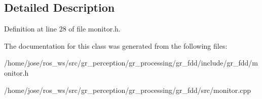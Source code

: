 \subsection{Detailed Description}


Definition at line 28 of file monitor.\+h.



The documentation for this class was generated from the following files\+:\begin{DoxyCompactItemize}
\item 
/home/jose/ros\+\_\+ws/src/gr\+\_\+perception/gr\+\_\+processing/gr\+\_\+fdd/include/gr\+\_\+fdd/monitor.\+h\item 
/home/jose/ros\+\_\+ws/src/gr\+\_\+perception/gr\+\_\+processing/gr\+\_\+fdd/src/monitor.\+cpp\end{DoxyCompactItemize}
